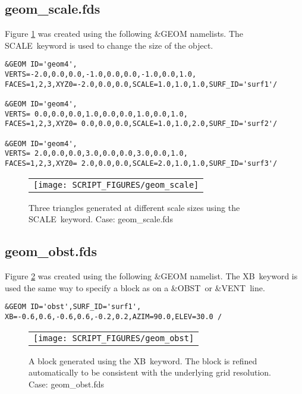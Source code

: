 \documentclass[12pt]{article}
\begin{document}
\subsection{geom\_scale.fds}
Figure \ref{fig:geom_scale} was created using the following \&GEOM namelists.
The {\ct SCALE}\ keyword is used to change the size of the object.

{\small
\begin{verbatim}
&GEOM ID='geom4',
VERTS=-2.0,0.0,0.0,-1.0,0.0,0.0,-1.0,0.0,1.0,
FACES=1,2,3,XYZ0=-2.0,0.0,0.0,SCALE=1.0,1.0,1.0,SURF_ID='surf1'/

&GEOM ID='geom4',
VERTS= 0.0,0.0,0.0,1.0,0.0,0.0,1.0,0.0,1.0,
FACES=1,2,3,XYZ0= 0.0,0.0,0.0,SCALE=1.0,1.0,2.0,SURF_ID='surf2'/

&GEOM ID='geom4',
VERTS= 2.0,0.0,0.0,3.0,0.0,0.0,3.0,0.0,1.0,
FACES=1,2,3,XYZ0= 2.0,0.0,0.0,SCALE=2.0,1.0,1.0,SURF_ID='surf3'/
\end{verbatim}
}

\begin{figure}
\begin{center}
\begin{tabular}{c}
 \texttt{[image: SCRIPT\_FIGURES/geom\_scale]}
  \end{tabular}
\end{center}
\caption{Three triangles generated at different scale sizes using the {\ct SCALE}\ keyword. Case: geom\_scale.fds}
\label{fig:geom_scale}
\end{figure}

\subsection{geom\_obst.fds}
Figure \ref{fig:geom_obst} was created using the following \&GEOM namelist.
The {\ct XB}\ keyword is used the same way to specify a block as on
a {\ct \&OBST}\ or {\ct \&VENT}\ line.

{\scriptsize
\begin{verbatim}
&GEOM ID='obst',SURF_ID='surf1', XB=-0.6,0.6,-0.6,0.6,-0.2,0.2,AZIM=90.0,ELEV=30.0 /
\end{verbatim}
}

\begin{figure}
\begin{center}
\begin{tabular}{c}
 \texttt{[image: SCRIPT\_FIGURES/geom\_obst]}
  \end{tabular}
\end{center}
 \caption{A block generated using the {\ct XB}\ keyword.  The block is refined automatically to be consistent with the underlying grid resolution. Case: geom\_obst.fds}
\label{fig:geom_obst}
\end{figure}
\end{document}
